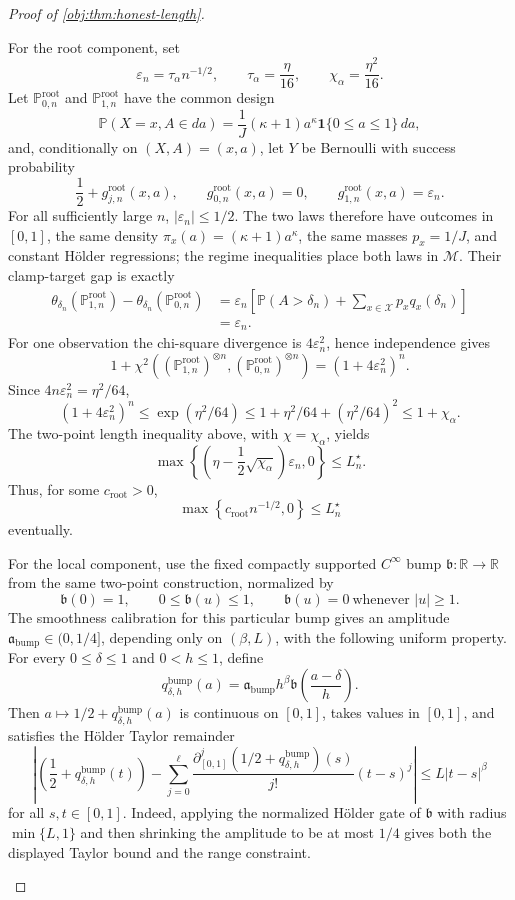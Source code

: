 \documentclass[11pt]{article}
\begin{document}
\begin{proof}[Proof of \cref{obj:thm:honest-length}]
\begin{enumerate}
For the root component, set
\[
\varepsilon_n=\tau_\alpha n^{-1/2},
\qquad
\tau_\alpha=\frac{\eta}{16},
\qquad
\chi_\alpha=\frac{\eta^2}{16}.
\]
Let \(\mathbb P^{\mathrm{root}}_{0,n}\) and \(\mathbb P^{\mathrm{root}}_{1,n}\) have the common design
\[
\mathbb P(X=x,A\in da)=\frac1J(\kappa+1)a^\kappa\mathbf 1\{0\leq a\leq1\}\,da,
\]
and, conditionally on \((X,A)=(x,a)\), let \(Y\) be Bernoulli with success probability
\[
\frac12+g^{\mathrm{root}}_{j,n}(x,a),
\qquad
g^{\mathrm{root}}_{0,n}(x,a)=0,\qquad
g^{\mathrm{root}}_{1,n}(x,a)=\varepsilon_n .
\]
For all sufficiently large \(n\), \(|\varepsilon_n|\leq1/2\). The two laws therefore have outcomes in \([0,1]\), the same density \(\pi_x(a)=(\kappa+1)a^\kappa\), the same masses \(p_x=1/J\), and constant Hölder regressions; the regime inequalities place both laws in \(\mathcal M\). Their clamp-target gap is exactly
\[
\begin{aligned}
\theta_{\delta_n}(\mathbb P^{\mathrm{root}}_{1,n})
-\theta_{\delta_n}(\mathbb P^{\mathrm{root}}_{0,n})
&=\varepsilon_n
\left[
\mathbb P(A>\delta_n)+\sum_{x\in\mathcal X}p_xq_x(\delta_n)
\right] \\
&=\varepsilon_n .
\end{aligned}
\]
For one observation the chi-square divergence is \(4\varepsilon_n^2\), hence independence gives
\[
1+\chi^2\!\left((\mathbb P^{\mathrm{root}}_{1,n})^{\otimes n},
(\mathbb P^{\mathrm{root}}_{0,n})^{\otimes n}\right)
=(1+4\varepsilon_n^2)^n.
\]
Since \(4n\varepsilon_n^2=\eta^2/64\),
\[
(1+4\varepsilon_n^2)^n
\le \exp(\eta^2/64)
\le 1+\eta^2/64+(\eta^2/64)^2
\le 1+\chi_\alpha .
\]
The two-point length inequality above, with \(\chi=\chi_\alpha\), yields
\[
\max\!\left\{
\left(\eta-\frac12\sqrt{\chi_\alpha}\right)\varepsilon_n,0
\right\}
\le L_n^\star .
\]
Thus, for some \(c_{\mathrm{root}}>0\),
\[
\max\!\left\{c_{\mathrm{root}}n^{-1/2},0\right\}
\le L_n^\star
\]
eventually.

For the local component, use the fixed compactly supported \(C^\infty\) bump \(\mathfrak b:\mathbb R\to\mathbb R\) from the same two-point construction, normalized by
\[
\mathfrak b(0)=1,
\qquad
0\leq\mathfrak b(u)\leq1,
\qquad
\mathfrak b(u)=0\ \text{whenever } |u|\geq1 .
\]
The smoothness calibration for this particular bump gives an amplitude
\(\mathfrak a_{\mathrm{bump}}\in(0,1/4]\), depending only on \((\beta,L)\), with the following uniform property. For every \(0\leq\delta\leq1\) and \(0<h\leq1\), define
\[
q_{\delta,h}^{\mathrm{bump}}(a)
=
\mathfrak a_{\mathrm{bump}}h^\beta
\mathfrak b\!\left(\frac{a-\delta}{h}\right).
\]
Then \(a\mapsto 1/2+q_{\delta,h}^{\mathrm{bump}}(a)\) is continuous on \([0,1]\), takes values in \([0,1]\), and satisfies the Hölder Taylor remainder
\[
\left|
\left(\frac12+q_{\delta,h}^{\mathrm{bump}}(t)\right)
-
\sum_{j=0}^{\ell}
\frac{\partial_{[0,1]}^j(1/2+q_{\delta,h}^{\mathrm{bump}})(s)}{j!}(t-s)^j
\right|
\le L|t-s|^\beta
\]
for all \(s,t\in[0,1]\). Indeed, applying the normalized Hölder gate of \(\mathfrak b\) with radius \(\min\{L,1\}\) and then shrinking the amplitude to be at most \(1/4\) gives both the displayed Taylor bound and the range constraint.


\end{enumerate}
\end{proof}
\end{document}
